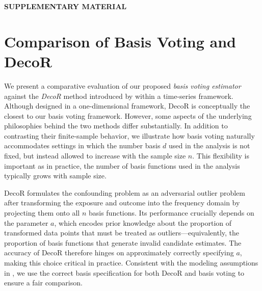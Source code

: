 \documentclass[
  12pt]{article}
\begin{document}
% 


\newpage
\renewcommand{\thesection}{S\arabic{section}} 
\setcounter{section}{0}
\renewcommand{\thelemma}{S\arabic{section}.\arabic{lemma}}
\setcounter{lemma}{0}

\makeatletter
\renewcommand{\theHsection}{S\arabic{section}}
\renewcommand{\theHlemma}{S\arabic{section}.\arabic{lemma}}
\makeatother

\label{supplementary-material}
\bigskip

\begin{center}

{\large\bf SUPPLEMENTARY MATERIAL}

\end{center}

\section{Comparison of Basis Voting and DecoR}\label{supsec:decor-vs-bv}

We present a comparative evaluation of our proposed \emph{basis voting estimator} against the \emph{DecoR} method introduced by \cite{schur2025decor} within a time-series framework. Although designed in a one-dimensional framework, DecoR is conceptually the closest to our basis voting framework. However, some aspects of the underlying philosophies behind the two methods differ substantially. In addition to contrasting their finite-sample behavior, we illustrate how basis voting naturally accommodates settings in which the number basis $d$ used in the analysis is not fixed, but instead allowed to increase with the sample size $n$. This flexibility is important as in practice, %
the number of basis functions used in the analysis typically grows with sample size. %

DecoR formulates the confounding problem as an adversarial outlier problem after transforming the exposure and outcome into the frequency domain by projecting them onto all $n$ basis functions. Its performance crucially depends on the parameter $a$, which encodes prior knowledge about the proportion of transformed data points that must be treated as outliers---equivalently, the proportion of basis functions that generate invalid candidate estimates. The accuracy of DecoR therefore hinges on approximately correctly specifying $a$, making this choice critical in practice. Consistent with the modeling assumptions in \cite{schur2025decor}, we use the correct basis specification for both DecoR and basis voting to ensure a fair comparison.
\end{document}
